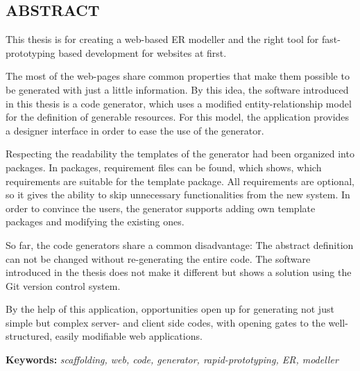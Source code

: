 \begin{center}
\section*{\textbf{\Large \MakeUppercase{\textrm{Abstract}}}}
\end{center}



\begin{justify}
This thesis is for creating a web-based ER modeller and the right tool for fast-prototyping based development for websites at first.

The most of the web-pages share common properties that make them possible to be generated with just a little information. By this idea, the software introduced in this thesis is a code generator, which uses a modified entity-relationship model for the definition of generable resources. For this model, the application provides a designer interface in order to ease the use of the generator.

Respecting the readability the templates of the generator had been organized into packages. In packages, requirement files can be found, which shows, which requirements are suitable for the template package. All requirements are optional, so it gives the ability to skip unnecessary functionalities from the new system. In order to convince the users, the generator supports adding own template packages and modifying the existing ones.

So far, the code generators share a common disadvantage: The abstract definition can not be changed without re-generating the entire code. The software introduced in the thesis does not make it different but shows a solution using the Git version control system. 

By the help of this application, opportunities open up for generating not just simple but complex server- and client side codes, with opening gates to the well-structured, easily modifiable web applications. 
\end{justify}



\vspace{2cm}

{\bf Keywords:} {\it  scaffolding, web, code, generator, rapid-prototyping, ER, modeller}